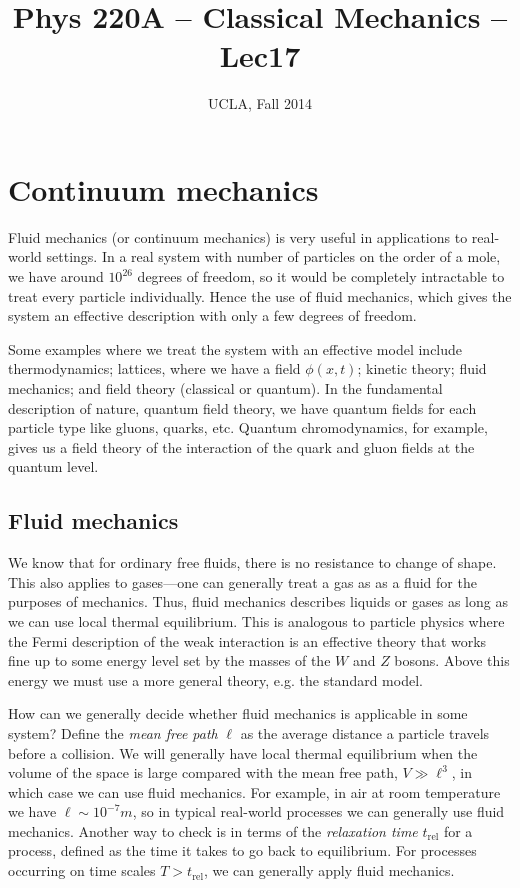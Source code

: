 \documentclass[12pt]{article} %
\title{Phys 220A -- Classical Mechanics -- Lec17}
\author{UCLA, Fall 2014}
\date{\formatdate{9}{12}{2014}} %
\begin{document}
\setlength{\unitlength}{1mm}
\maketitle


\section{Continuum mechanics}

Fluid mechanics (or continuum mechanics) is very useful in applications to real-world settings. In a real system with number of particles on the order of a mole, we have around $10^{26}$ degrees of freedom, so it would be completely intractable to treat every particle individually. Hence the use of fluid mechanics, which gives the system an effective description with only a few degrees of freedom. 

Some examples where we treat the system with an effective model include thermodynamics; lattices, where we have a field $\phi(x,t)$; kinetic theory; fluid mechanics; and field theory (classical or quantum). In the fundamental description of nature, quantum field theory, we have quantum fields for each particle type like gluons, quarks, etc. Quantum chromodynamics, for example, gives us a field theory of the interaction of the quark and gluon fields at the quantum level. 


\subsection{Fluid mechanics}

We know that for ordinary free fluids, there is no resistance to change of shape. This also applies to gases---one can generally treat a gas as as a fluid for the purposes of mechanics. Thus, fluid mechanics describes liquids or gases as long as we can use local thermal equilibrium. This is analogous to particle physics where the Fermi description of the weak interaction is an effective theory that works fine up to some energy level set by the masses of the $W$ and $Z$ bosons. Above this energy we must use a more general theory, e.g. the standard model. 

How can we generally decide whether fluid mechanics is applicable in some system? Define the \emph{mean free path} $\ell$ as the average distance a particle travels before a collision. We will generally have local thermal equilibrium when the volume of the space is large compared with the mean free path, $V \gg \ell^3$, in which case we can use fluid mechanics. For example, in air at room temperature we have $\ell \sim \unit{10^{-7}}{m}$, so in typical real-world processes we can generally use fluid mechanics. Another way to check is in terms of the \emph{relaxation time} $t_\mathrm{rel}$ for a process, defined as the time it takes to go back to equilibrium. For processes occurring on time scales $T > t_\mathrm{rel}$, we can generally apply fluid mechanics.
\end{document}
